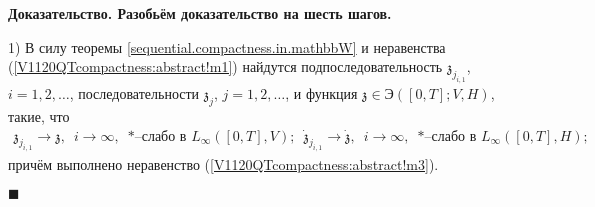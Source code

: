 \documentclass{report}
\newenvironment{Proof}{\par\noindent\bf Доказательство.\rm}{ $\blacksquare$\par}
\begin{document}
\begin{Proof} Разобьём доказательство на шесть шагов.

1) В силу теоремы \ref{sequential.compactness.in.mathbbW} и неравенства (\ref{V1120QTcompactness:abstract!m1}) найдутся подпоследовательность $\mathfrak{z}_{j_{i,1}}$, $i=1,2,\dots$,
последовательности $\mathfrak{z}_j$, $j=1,2,\dots$, и функция $\mathfrak{z}\in \textrm{Э}([0,T];V,H)$, такие, что
\begin{gather}\label{V1120QTcompactness:abstract!m4}
\mathfrak{z}_{j_{i,1}}\to\mathfrak{z},\,\,\,i\to\infty,\,\,\,\mbox{$*$--слабо в $L_\infty([0,T],V)$};\,\,\,
\dot{\mathfrak{z}}_{j_{i,1}}\to\dot{\mathfrak{z}},\,\,\,i\to\infty,\,\,\,\mbox{$*$--слабо в $L_\infty([0,T],H)$};
\end{gather}
причём выполнено неравенство (\ref{V1120QTcompactness:abstract!m3}).


\end{Proof}
\end{document}

